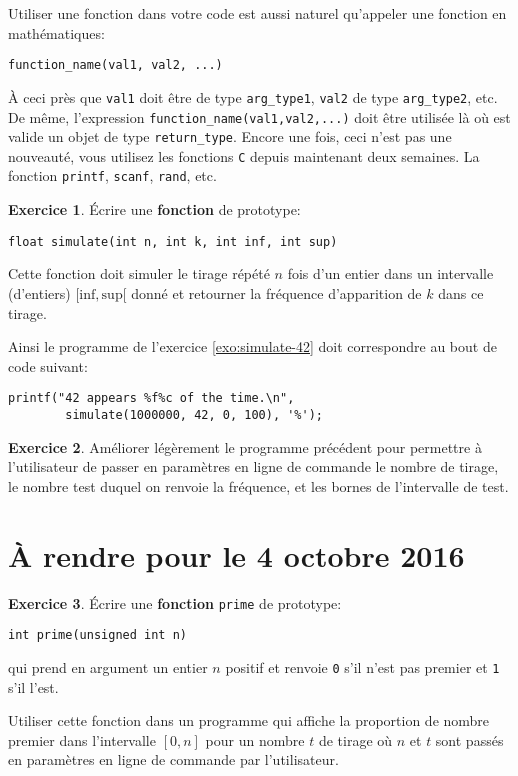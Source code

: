 \documentclass[french,a4paper]{article}
\theoremstyle{definition}
\newtheorem{exercise}{Exercice}
\theoremstyle{remark}
\newcommand{\inlinec}[1]{\lstinline[style=C]°#1°}
\begin{document}
Utiliser une fonction dans votre code est aussi naturel qu'appeler une
fonction en mathématiques:
\begin{lstlisting}
function_name(val1, val2, ...)
\end{lstlisting}
\`A ceci près que \inlinec{val1} doit être de type
\inlinec{arg_type1}, \inlinec{val2} de type \inlinec{arg_type2},
etc. De même, l'expression \inlinec{function_name(val1,val2,...)} doit
être utilisée là où est valide un objet de type
\inlinec{return_type}. Encore une fois, ceci n'est pas une nouveauté,
vous utilisez les fonctions {\tt C} depuis maintenant deux
semaines. La fonction \inlinec{printf}, \inlinec{scanf},
\inlinec{rand}, etc.

\begin{exercise}
  \'Ecrire une {\bf fonction} de prototype:
  \begin{lstlisting}
float simulate(int n, int k, int inf, int sup)
  \end{lstlisting}
  Cette fonction doit simuler le tirage répété $n$ fois d'un entier
  dans un intervalle (d'entiers) $[\mathrm{inf},\mathrm{sup}[$ donné
  et retourner la fréquence d'apparition de $k$ dans ce tirage.
  
  Ainsi le programme de l'exercice \ref{exo:simulate-42} doit
  correspondre au bout de code suivant:
  \begin{lstlisting}
printf("42 appears %f%c of the time.\n",
        simulate(1000000, 42, 0, 100), '%');
  \end{lstlisting}
\end{exercise}

\begin{exercise}
  Améliorer légèrement le programme précédent pour permettre à
  l'utilisateur de passer en paramètres en ligne de commande le nombre
  de tirage, le nombre test duquel on renvoie la fréquence, et les
  bornes de l'intervalle de test.
\end{exercise}

\section{\`A rendre pour le 4 octobre 2016}
\label{sec:homework}

\begin{exercise}
  \'Ecrire une {\bf fonction} \inlinec{prime} de prototype:
  \begin{lstlisting}
int prime(unsigned int n)
  \end{lstlisting}
  qui prend en argument un entier $n$ positif et renvoie \inlinec{0}
  s'il n'est pas premier et \inlinec{1} s'il l'est.

  Utiliser cette fonction dans un programme qui affiche la proportion
  de nombre premier dans l'intervalle $[0,n]$ pour un nombre $t$ de
  tirage où $n$ et $t$ sont passés en paramètres en ligne de commande
  par l'utilisateur.
\end{exercise}
\end{document}
